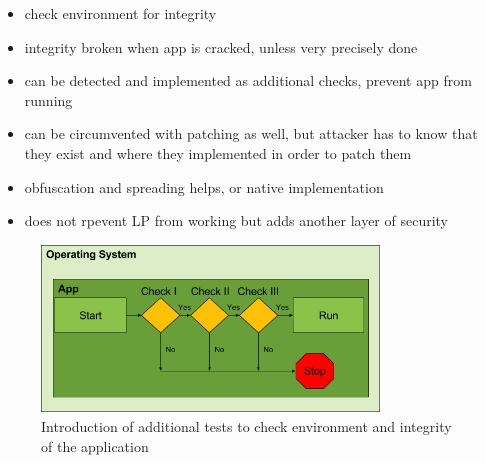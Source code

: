 \begin{itemize}
    \item check environment for integrity
    \item integrity broken when app is cracked, unless very precisely done
    \item can be detected and implemented as additional checks, prevent app from running
    \item can be circumvented with patching as well, but attacker has to know that they exist and where they implemented in order to patch them
    \item obfuscation and spreading helps, or native implementation
    \item does not rpevent LP from working but adds another layer of security
\end{itemize}
\begin{figure}[h]
    \centering
    \includegraphics[width=0.8\textwidth]{data/verificationNowAdditional.png}
    \caption{Introduction of additional tests to check environment and integrity of the application}
    \label{fig:verificationNowAdditional}
\end{figure}
